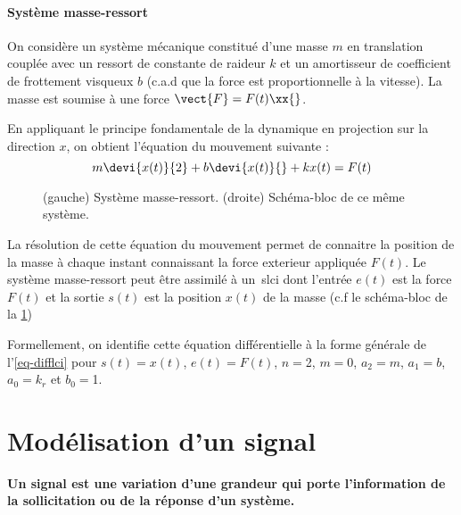 \paragraph{Système masse-ressort}
On considère un système mécanique constitué d'une masse $m$ en translation 
couplée avec un ressort de constante
de raideur $k$ et un amortisseur de coefficient de frottement 
visqueux $b$ (c.a.d que la force est 
proportionnelle à la vitesse). 
La masse est soumise à une force $\vect{F}=F(t)\xx{}$.

En appliquant le principe fondamentale de la dynamique en projection 
sur la direction $x$, on obtient l'équation du mouvement suivante :
$$
m\devi{x(t)}{2}+b\devi{x(t)}{}+kx(t)=F(t)
$$
\begin{figure}[!h]
    \centering
    
    \caption{(gauche) Système masse-ressort. (droite) Schéma-bloc de ce même 
    système.
    \label{fig-masse-ressort}}
\end{figure}

La résolution de cette équation du mouvement permet de connaitre la position 
de la masse à chaque instant connaissant la force exterieur 
appliquée $F(t)$. Le système masse-ressort peut être assimilé à un~\gls{slci} 
dont l'entrée $e(t)$ est la force $F(t)$ et la sortie $s(t)$ est la 
position $x(t)$ de la masse (c.f le schéma-bloc de la \cref{fig-masse-ressort})

Formellement, on identifie cette équation différentielle à la forme générale 
de l'\cref{eq-difflci} pour $s(t)=x(t)$, $e(t)=F(t)$, 
$n=$2, $m=0$, $a_2=m$, $a_1=b$, $a_0=k_r$ et $b_0=$1.


\section{Modélisation d'un signal}
\textbf{Un signal est une variation d'une grandeur qui porte l'information 
de la sollicitation ou de la réponse d'un système.}

